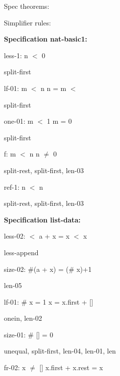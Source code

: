 \documentclass[a4paper]{article}
\begin{document}
\raggedright
              
Spec theorems: 





Simplifier rules: 


{\bf Specification nat-basic1:}

less-1: 
 \Fol \Not n $<$ 0



split-first

\bigskip

lf-01: 
 \Fol m $<$ n \And n =  \Imp m $<$ 



split-first

\bigskip

one-01: 
 \Fol m $<$ 1 \Equiv m = 0



split-first

\bigskip

f: 
 \Fol m $<$ n \Imp n $\neq$ 0



split-rest, split-first, len-03

\bigskip

ref-1: 
 \Fol \Not n $<$ n



split-rest, split-first, len-03

\bigskip

{\bf Specification list-data:}

less-02: 
 \Fol {} $<$ a + x \Equiv {} = x \Or {} $<$ x



less-append

\bigskip

size-02: 
 \Fol \#(a + x) = (\# x)+1



len-05

\bigskip

lf-01: 
 \Fol \# x = 1 \Equiv x = x.first + []



onein, len-02

\bigskip

size-01: 
 \Fol \# [] = 0



unequal, split-first, len-04, len-01, len

\bigskip

fr-02: 
 \Fol x $\neq$ [] \Imp x.first + x.rest = x
\end{document}
